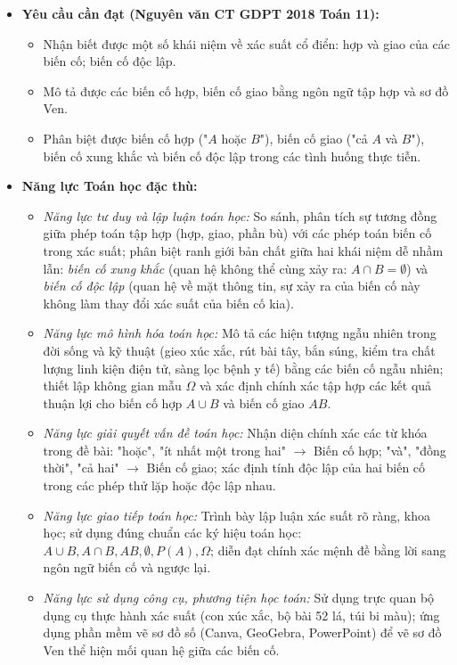 \documentclass[12pt, a4paper]{article}
\begin{document}
\begin{itemize}[leftmargin=1.2cm]
    \item \textbf{Yêu cầu cần đạt (Nguyên văn CT GDPT 2018 Toán 11):}
    \begin{itemize}[leftmargin=0.6cm]
        \item Nhận biết được một số khái niệm về xác suất cổ điển: hợp và giao của các biến cố; biến cố độc lập.
        \item Mô tả được các biến cố hợp, biến cố giao bằng ngôn ngữ tập hợp và sơ đồ Ven.
        \item Phân biệt được biến cố hợp ("$A$ hoặc $B$"), biến cố giao ("cả $A$ và $B$"), biến cố xung khắc và biến cố độc lập trong các tình huống thực tiễn.
    \end{itemize}

    \item \textbf{Năng lực Toán học đặc thù:}
    \begin{itemize}[leftmargin=0.6cm]
        \item \textit{Năng lực tư duy và lập luận toán học:} So sánh, phân tích sự tương đồng giữa phép toán tập hợp (hợp, giao, phần bù) với các phép toán biến cố trong xác suất; phân biệt ranh giới bản chất giữa hai khái niệm dễ nhầm lẫn: \textit{biến cố xung khắc} (quan hệ không thể cùng xảy ra: $A \cap B = \emptyset$) và \textit{biến cố độc lập} (quan hệ về mặt thông tin, sự xảy ra của biến cố này không làm thay đổi xác suất của biến cố kia).
        \item \textit{Năng lực mô hình hóa toán học:} Mô tả các hiện tượng ngẫu nhiên trong đời sống và kỹ thuật (gieo xúc xắc, rút bài tây, bắn súng, kiểm tra chất lượng linh kiện điện tử, sàng lọc bệnh y tế) bằng các biến cố ngẫu nhiên; thiết lập không gian mẫu $\Omega$ và xác định chính xác tập hợp các kết quả thuận lợi cho biến cố hợp $A \cup B$ và biến cố giao $AB$.
        \item \textit{Năng lực giải quyết vấn đề toán học:} Nhận diện chính xác các từ khóa trong đề bài: "hoặc", "ít nhất một trong hai" $\to$ Biến cố hợp; "và", "đồng thời", "cả hai" $\to$ Biến cố giao; xác định tính độc lập của hai biến cố trong các phép thử lặp hoặc độc lập nhau.
        \item \textit{Năng lực giao tiếp toán học:} Trình bày lập luận xác suất rõ ràng, khoa học; sử dụng đúng chuẩn các ký hiệu toán học: $A \cup B, A \cap B, AB, \emptyset, P(A), \Omega$; diễn đạt chính xác mệnh đề bằng lời sang ngôn ngữ biến cố và ngược lại.
        \item \textit{Năng lực sử dụng công cụ, phương tiện học toán:} Sử dụng trực quan bộ dụng cụ thực hành xác suất (con xúc xắc, bộ bài 52 lá, túi bi màu); ứng dụng phần mềm vẽ sơ đồ số (Canva, GeoGebra, PowerPoint) để vẽ sơ đồ Ven thể hiện mối quan hệ giữa các biến cố.
    \end{itemize}


\end{itemize}
\end{document}

